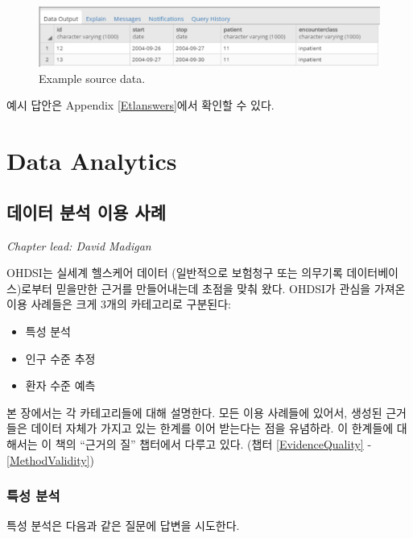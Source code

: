 \documentclass[11pt]{book}
\providecommand{\tightlist}{%
  \setlength{\itemsep}{0pt}\setlength{\parskip}{0pt}}
\theoremstyle{definition}
\theoremstyle{definition}
\theoremstyle{definition}
\theoremstyle{remark}
\begin{document}
\begin{figure}

{\centering \includegraphics[width=1\linewidth]{images/ExtractTransformLoad/exerciseSourceData} 

}

\caption{Example source data.}\label{fig:exerciseSourceData}
\end{figure}

예시 답안은 Appendix \ref{Etlanswers}에서 확인할 수 있다.

\part{Data Analytics}\label{part-data-analytics}

\chapter{데이터 분석 이용 사례}\label{DataAnalyticsUseCases}

\emph{Chapter lead: David Madigan}

OHDSI는 실세계 헬스케어 데이터 (일반적으로 보험청구 또는 의무기록
데이터베이스)로부터 믿을만한 근거를 만들어내는데 초점을 맞춰 왔다.
OHDSI가 관심을 가져온 이용 사례들은 크게 3개의 카테고리로 구분된다:

\begin{itemize}
\tightlist
\item
  특성 분석
\item
  인구 수준 추정
\item
  환자 수준 예측
\end{itemize}

본 장에서는 각 카테고리들에 대해 설명한다. 모든 이용 사례들에 있어서,
생성된 근거들은 데이터 자체가 가지고 있는 한계를 이어 받는다는 점을
유념하라. 이 한계들에 대해서는 이 책의 ``근거의 질'' 챕터에서 다루고
있다. (챕터 \ref{EvidenceQuality} - \ref{MethodValidity})

\section{특성 분석}\label{-}


특성 분석은 다음과 같은 질문에 답변을 시도한다.
\end{document}
